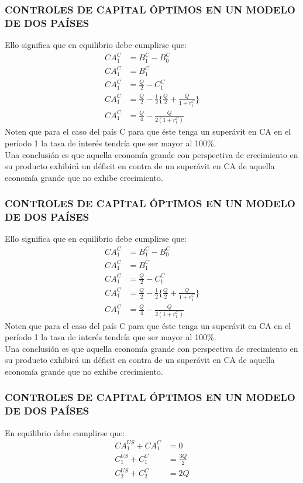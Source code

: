 \documentclass[10pt, xcolor=table, x11names]{beamer}
\begin{document}
\begin{frame}[label=6]
	\frametitle{{\normalsize CONTROLES DE CAPITAL ÓPTIMOS EN UN MODELO DE DOS PAÍSES} {}}
	Ello significa que en equilibrio debe cumplirse que:
	\begin{align}
	CA_{1}^{C}&=B_{1}^{C}-B_{0}^{C}\nonumber \\
	CA_{1}^{C}&=B_{1}^{C}\nonumber \\
	CA_{1}^{C}&=\frac{Q}{2}-C_{1}^{C}\nonumber \\
	CA_{1}^{C}&=\frac{Q}{2}-\frac{1}{2}\{\frac{Q}{2}+\frac{Q}{1+r_{1}^{C}}\}\nonumber \\
	CA_{1}^{C}&=\frac{Q}{4}-\frac{Q}{2(1+r_{1}^{C})}
	\end{align}
	Noten que para el caso del país C para que éste tenga un superávit en CA en el período 1 la tasa de interés tendría que ser mayor al 100\%. \\
	Una conclusión es que aquella economía grande con perspectiva de crecimiento en su producto exhibirá un déficit en contra de un superávit en CA de aquella economía grande que no exhibe crecimiento.
	
\end{frame}


\begin{frame}[label=7]
	\frametitle{{\normalsize CONTROLES DE CAPITAL ÓPTIMOS EN UN MODELO DE DOS PAÍSES} {}}
	Ello significa que en equilibrio debe cumplirse que:
	\begin{align}
	CA_{1}^{C}&=B_{1}^{C}-B_{0}^{C}\nonumber \\
	CA_{1}^{C}&=B_{1}^{C}\nonumber \\
	CA_{1}^{C}&=\frac{Q}{2}-C_{1}^{C}\nonumber \\
	CA_{1}^{C}&=\frac{Q}{2}-\frac{1}{2}\{\frac{Q}{2}+\frac{Q}{1+r_{1}^{C}}\}\nonumber \\
	CA_{1}^{C}&=\frac{Q}{4}-\frac{Q}{2(1+r_{1}^{C})}
	\end{align}
	Noten que para el caso del país C para que éste tenga un superávit en CA en el período 1 la tasa de interés tendría que ser mayor al 100\%. \\
	Una conclusión es que aquella economía grande con perspectiva de crecimiento en su producto exhibirá un déficit en contra de un superávit en CA de aquella economía grande que no exhibe crecimiento.
	
\end{frame}

\begin{frame}[label=8]
	\frametitle{{\normalsize CONTROLES DE CAPITAL ÓPTIMOS EN UN MODELO DE DOS PAÍSES} {}}
	En equilibrio debe cumplirse que:
	\begin{align}
	CA_{1}^{US}+CA_{1}^{C}&=0\\
	C_{1}^{US}+C_{1}^{C}&=\frac{3Q}{2} \\
	C_{2}^{US}+C_{2}^{C}&=2Q 
	\end{align}

\end{frame}
\end{document}
